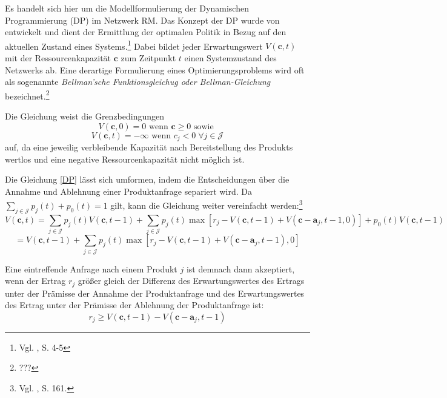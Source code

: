 Es handelt sich hier um die Modellformulierung der Dynamischen Programmierung (DP) im Netzwerk RM. Das Konzept der DP wurde von \citeauthor{bellman1954theory} entwickelt und dient der Ermittlung der optimalen Politik in Bezug auf den aktuellen Zustand eines Systems.\footnote{Vgl. \cite{bellman1954theory}, S. 4-5} Dabei bildet jeder Erwartungswert $V(\textbf{c},t)$ mit der Ressourcenkapazität $\textbf{c}$ zum Zeitpunkt $t$ einen Systemzustand des Netzwerks ab. Eine derartige Formulierung eines Optimierungsproblems wird oft als sogenannte \textit{Bellman'sche Funktionsgleichug oder Bellman-Gleichung} bezeichnet.\footnote{???}

Die Gleichung weist die Grenzbedingungen
\begin{equation}\label{GB1}
V(\textbf{c},0)=0 \text{ wenn } \textbf{c}\ge0 \text{ sowie }
\end{equation}
\begin{equation}\label{GB2}
V(\textbf{c},t)=-\infty \text{ wenn } c_{j}<0 \;\forall j\in\mathcal{J}
\end{equation}
auf, da eine jeweilig verbleibende Kapazität nach Bereitstellung des Produkts wertlos und eine negative Ressourcenkapazität nicht möglich ist. 

Die Gleichung \eqref{DP} lässt sich umformen, indem die Entscheidungen über die Annahme und Ablehnung einer Produktanfrage separiert wird. Da $\sum_{j\in \mathcal{J}}p_{j}(t)+p_{0}(t)=1$ gilt, kann die Gleichung weiter vereinfacht werden:\footnote{Vgl. \cite{Spengler:2007aa}, S. 161.}
\begin{equation*}
V(\textbf{c},t)=\sum_{j\in\mathcal{J}}p_{j}(t) V(\textbf{c},t-1) + \sum_{j\in\mathcal{J}}p_{j}(t) \max[r_{j}-V(\textbf{c},t-1)+V(\textbf{c}-\textbf{a}_{j},t-1,0)]+p_{0}(t)V(\textbf{c},t-1)
\end{equation*}
\begin{equation}\label{DP2}
=V(\textbf{c},t-1) + \sum_{j\in\mathcal{J}}p_{j}(t) \max[r_{j}-V(\textbf{c},t-1)+V(\textbf{c}-\textbf{a}_{j},t-1),0]
\end{equation}

Eine eintreffende Anfrage nach einem Produkt $j$ ist demnach dann akzeptiert, wenn der Ertrag $r_{j}$ größer gleich der Differenz des Erwartungswertes des Ertrags unter der Prämisse der Annahme der Produktanfrage und des Erwartungswertes des Ertrag unter der Prämisse der Ablehnung der Produktanfrage ist:
\begin{equation}\label{r}
r_{j} \ge V(\textbf{c},t-1)-V(\textbf{c}-\textbf{a}_{j},t-1)
\end{equation}

